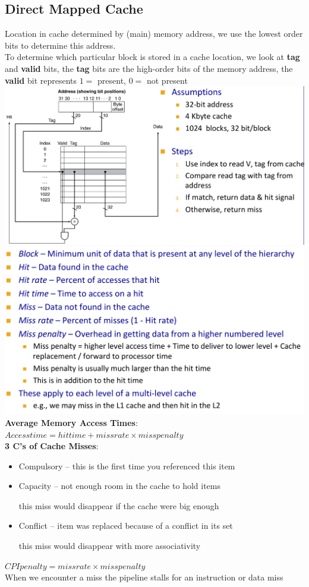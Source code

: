 \subsection*{Direct Mapped Cache}
Location in cache determined by (main) memory address, we use the lowest order
bits to determine this address.\\
To determine which particular block is stored in a cache location, we look at
\textbf{tag} and \textbf{valid} bits, the \textbf{tag} bits are the high-order
bits of the memory address, the \textbf{valid} bit represents $1 =$ present,
$0 =$ not present
\includegraphics[width=\linewidth]{png/cache.png}
\includegraphics[width=\linewidth]{png/term.png}
\textbf{Average Memory Access Times}: \\
$Access time = hit time + miss rate \times miss penalty$\\
\textbf{3 C's of Cache Misses}:
\begin{itemize}
\item Compulsory – this is the first time you referenced this item
\item Capacity – not enough room in the cache to hold items
\par this miss would disappear if the cache were big enough
\item Conflict – item was replaced because of a conflict in its set
\par this miss would disappear with more associativity
\end{itemize}
$CPI penalty = miss rate \times miss penalty$\\
When we encounter a miss the pipeline stalls for an instruction or data miss \\


